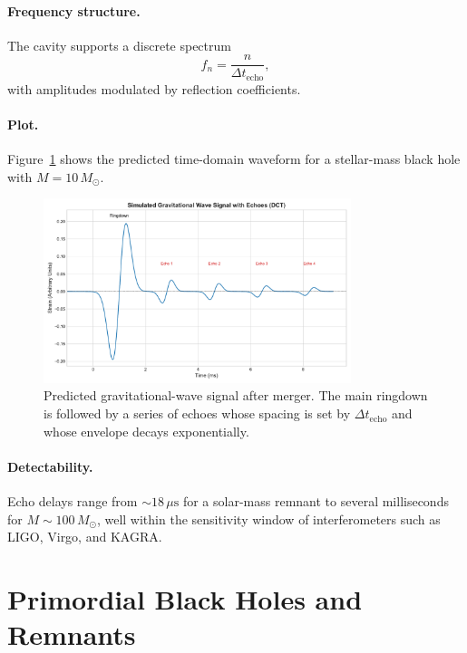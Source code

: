 \documentclass[a4paper, 12pt, oneside]{book}
\numberwithin{equation}{chapter}
\begin{document}
\paragraph{Frequency structure.}
The cavity supports a discrete spectrum
\[
    f_n = \frac{n}{\Delta t_{\text{echo}}},
\]
with amplitudes modulated by reflection coefficients.

\paragraph{Plot.}
Figure~\ref{fig:echo-spectrum} shows the predicted time-domain waveform
for a stellar-mass black hole with \(M = 10\,M_\odot\).

\begin{figure}[ht]
    \centering
    \includegraphics[width=0.8\textwidth]{figures/echo_waveform.pdf}
    \caption[Predicted gravitational-wave signal after merger]{Predicted gravitational-wave signal after merger.
    The main ringdown is followed by a series of echoes whose spacing is
    set by \(\Delta t_{\text{echo}}\) and whose envelope decays
    exponentially.}
    \label{fig:echo-spectrum}
\end{figure}

\paragraph{Detectability.}
Echo delays range from \(\sim 18\,\mu\text{s}\) for a solar-mass remnant
to several milliseconds for \(M\sim100\,M_\odot\), well within the
sensitivity window of interferometers such as LIGO, Virgo, and KAGRA.



\section{Primordial Black Holes and Remnants}
\label{sec:PBHs}
\end{document}
